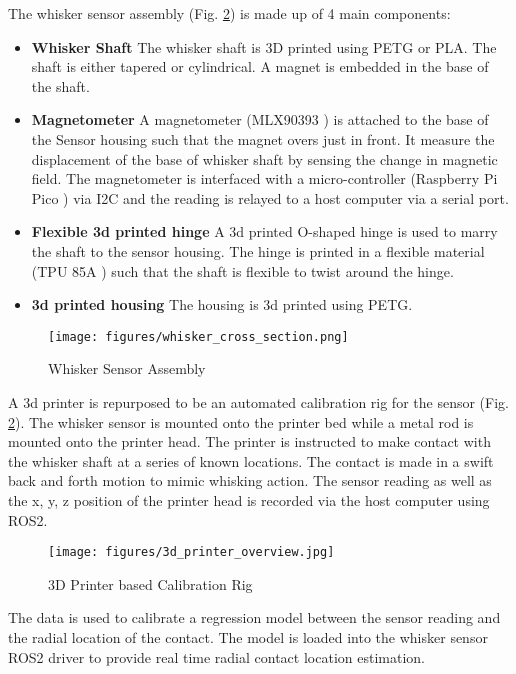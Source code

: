 \documentclass{report}
\begin{document}
The whisker sensor assembly (Fig. \ref{fig:whisker_sensor}) is made up of 4 main components:
\begin{itemize}
    \item \textbf{Whisker Shaft} The whisker shaft is 3D printed using PETG or PLA. The shaft is either tapered or cylindrical. A magnet is embedded in the base of the shaft.
    \item \textbf{Magnetometer} A magnetometer (MLX90393 \cite{industriesAdafruitWideRangeTripleaxis}) is attached to the base of the Sensor housing such that the magnet overs just in front. It measure the displacement of the base of whisker shaft by sensing the change in magnetic field. The magnetometer is interfaced with a micro-controller (Raspberry Pi Pico \cite{ltdBuyRaspberryPi}) via I2C and the reading is relayed to a host computer via a serial port.
    \item \textbf{Flexible 3d printed hinge} A 3d printed O-shaped hinge is used to marry the shaft to the sensor housing. The hinge is printed in a flexible material (TPU 85A \cite{NinjaFlex85ATPU}) such that the shaft is flexible to twist around the hinge.
    \item \textbf{3d printed housing} The housing is 3d printed using PETG.
\end{itemize}

\begin{figure}[H]
    \centering
    \texttt{[image: figures/whisker\_cross\_section.png]}
    \caption{Whisker Sensor Assembly}
    \label{fig:whisker_sensor}
\end{figure}

A 3d printer is repurposed to be an automated calibration rig for the sensor (Fig. \ref{fig:whisker_sensor}). The whisker sensor is mounted onto the printer bed while a metal rod is mounted onto the printer head. The printer is instructed to make contact with the whisker shaft at a series of known locations. The contact is made in a swift back and forth motion to mimic whisking action. The sensor reading as well as the x, y, z position of the printer head is recorded via the host computer using ROS2.

\begin{figure}[H]
    \centering
    \texttt{[image: figures/3d\_printer\_overview.jpg]}
    \caption{3D Printer based Calibration Rig}
    \label{fig:whisker_sensor}
\end{figure}

The data is used to calibrate a regression model between the sensor reading and the radial location of the contact. The model is loaded into the whisker sensor ROS2 driver to provide real time radial contact location estimation.
\end{document}
